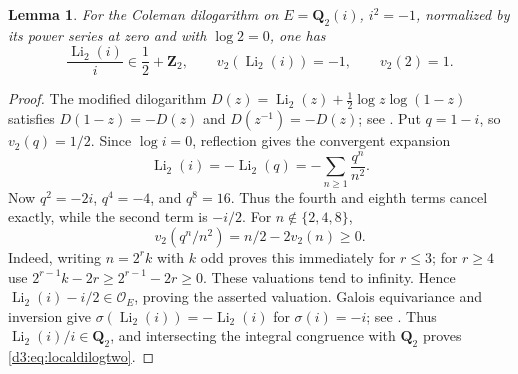 \documentclass[11pt,a4paper]{amsart}
\numberwithin{equation}{section}
\newtheorem{lemma}[theorem]{Lemma}
\theoremstyle{definition}
\theoremstyle{remark}
\newcommand{\Q}{\mathbf Q}
\newcommand{\Z}{\mathbf Z}
\newcommand{\OO}{\mathcal O}
\begin{document}
\begin{lemma}\label{d3:lem:localdilogtwo}
For the Coleman dilogarithm on $E=\Q_2(i)$, $i^2=-1$, normalized
by its power series at zero and with $\log2=0$, one has
\begin{equation}\label{d3:eq:localdilogtwo}
 \frac{\operatorname{Li}_2(i)}{i}\in\frac12+\Z_2,
 \qquad v_2(\operatorname{Li}_2(i))=-1,
 \qquad v_2(2)=1.
\end{equation}
\end{lemma}
\begin{proof}
The modified dilogarithm
$D(z)=\operatorname{Li}_2(z)+\frac12\log z\log(1-z)$
satisfies $D(1-z)=-D(z)$ and $D(z^{-1})=-D(z)$;
see \cite[equation~(1.8), p.~307, and p.~377]{BesserDeJeuCurves}.
Put $q=1-i$, so $v_2(q)=1/2$.
Since $\log i=0$, reflection gives the convergent expansion
\[
 \operatorname{Li}_2(i)
 =-\operatorname{Li}_2(q)
 =-\sum_{n\geq1}\frac{q^n}{n^2}.
\]
Now $q^2=-2i$, $q^4=-4$, and $q^8=16$. Thus the fourth and eighth
terms cancel exactly, while the second term is $-i/2$.
For $n\notin\{2,4,8\}$,
\[
 v_2(q^n/n^2)=n/2-2v_2(n)\geq0.
\]
Indeed, writing $n=2^rk$ with $k$ odd proves this immediately
for $r\leq3$; for $r\geq4$ use
$2^{r-1}k-2r\geq2^{r-1}-2r\geq0$.
These valuations tend to infinity. Hence
$\operatorname{Li}_2(i)-i/2\in\OO_E$, proving the asserted valuation.
Galois equivariance and inversion give
$\sigma(\operatorname{Li}_2(i))=-\operatorname{Li}_2(i)$
for $\sigma(i)=-i$; see
\cite[Remark~2.3 and equation~(1.2)]{BesserDeJeu}.
Thus $\operatorname{Li}_2(i)/i\in\Q_2$, and intersecting the integral
congruence with $\Q_2$ proves \eqref{d3:eq:localdilogtwo}.
\end{proof}
\end{document}
